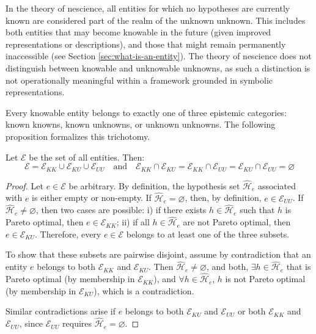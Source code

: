 In the theory of nescience, all entities for which no hypotheses are currently known are considered part of the realm of the unknown unknown. This includes both entities that may become knowable in the future (given improved representations or descriptions), and those that might remain permanently inaccessible (see Section \ref{sec:what-is-an-entity}). The theory of nescience does not distinguish between knowable and unknowable unknowns, as such a distinction is not operationally meaningful within a framework grounded in symbolic representations.

Every knowable entity belongs to exactly one of three epistemic categories: known knowns, known unknowns, or unknown unknowns. The following proposition formalizes this trichotomy.

\begin{proposition}
Let $\mathcal{E}$ be the set of all entities. Then:
\[
\mathcal{E} = \mathcal{E}_{KK} \cup \mathcal{E}_{KU} \cup \mathcal{E}_{UU}
\quad \text{and} \quad
\mathcal{E}_{KK} \cap \mathcal{E}_{KU} = \mathcal{E}_{KK} \cap \mathcal{E}_{UU} = \mathcal{E}_{KU} \cap \mathcal{E}_{UU} = \varnothing
\]
\end{proposition}
\begin{proof}
Let $e \in \mathcal{E}$ be arbitrary. By definition, the hypothesis set $\hat{\mathcal{H}}_e$ associated with $e$ is either empty or non-empty. If $\hat{\mathcal{H}}_e = \varnothing$, then, by definition, $e \in \mathcal{E}_{UU}$. If  $\hat{\mathcal{H}}_e \neq \varnothing$, then two cases are possible: i) if there exists $h \in \hat{\mathcal{H}}_e$ such that $h$ is Pareto optimal, then $e \in \mathcal{E}_{KK}$; ii) if all $h \in \hat{\mathcal{H}}_e$ are not Pareto optimal, then $e \in \mathcal{E}_{KU}$. Therefore, every $e \in \mathcal{E}$ belongs to at least one of the three subsets.

To show that these subsets are pairwise disjoint, assume by contradiction that an entity $e$ belongs to both $\mathcal{E}_{KK}$ and $\mathcal{E}_{KU}$. Then $\hat{\mathcal{H}}_e \neq \varnothing$, and both, $\exists h \in \hat{\mathcal{H}}_e$ that is Pareto optimal (by membership in $\mathcal{E}_{KK}$), and $\forall h \in \hat{\mathcal{H}}_e$, $h$ is not Pareto optimal (by membership in $\mathcal{E}_{KU}$), which is a contradiction.

Similar contradictions arise if $e$ belongs to both $\mathcal{E}_{KU}$ and $\mathcal{E}_{UU}$ or both $\mathcal{E}_{KK}$ and $\mathcal{E}_{UU}$, since $\mathcal{E}_{UU}$ requires $\hat{\mathcal{H}}_e = \varnothing$.
\end{proof}
     
